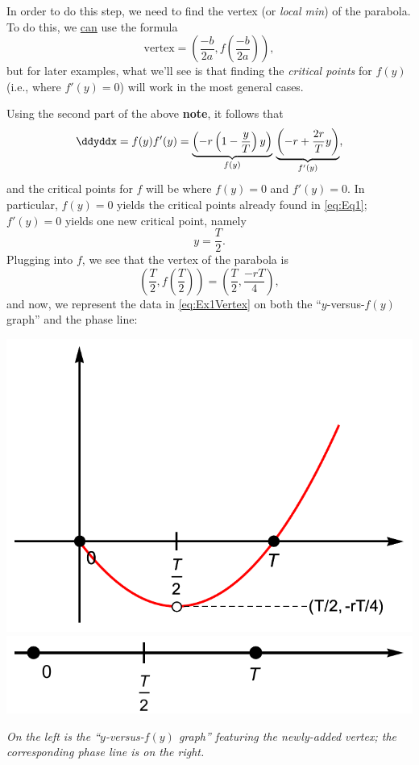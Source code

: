 \documentclass[12pt]{article}
\theoremstyle{definition}
\theoremstyle{underl}
\newcommand{\capt}[1]{\begin{adjustwidth}{0.5in}{0.5in}\centering\small\textit{#1}\end{adjustwidth}}
\begin{document}
	In order to do this step, we need to find the vertex (or \textit{local min}) of the parabola. To do this, we \ul{can} use the formula
	$$\text{vertex}=\left(\frac{-b}{2a},f\left(\frac{-b}{2a}\right)\right),$$
	but for later examples, what we'll see is that finding the \textit{critical points} for $f(y)$ (i.e., where $f'(y)=0$) will work in the most general cases.
	
	Using the second part of the above  \textbf{note}, it follows that
	\begin{equation}
		\label{eq:CritPt1}
		\ddyddx=f(y)f'(y)=\underbrace{\left(-r\left(1-\frac{y}{T}\right) y\right)}_{f(y)}\,\underbrace{\left(-r+\frac{2r}{T}y\right)}_{f'(y)},
	\end{equation}
	and the critical points for $f$ will be where $f(y)=0$ and $f'(y)=0$. In particular, $f(y)=0$ yields the critical points already found in \eqref{eq:Eq1}; $f'(y)=0$ yields one new critical point, namely
	$$y=\frac{T}{2}.$$
	Plugging into $f$, we see that the vertex of the parabola is
	\begin{equation}
		\label{eq:Ex1Vertex}
		\left(\frac{T}{2},f\left(\frac{T}{2}\right)\right)=\left(\frac{T}{2},\frac{-rT}{4}\right),
	\end{equation}
	and now, we represent the data in \eqref{eq:Ex1Vertex} on both the ``$y$-versus-$f(y)$ graph'' and the phase line:
	\begin{center}
		\includegraphics[align=c,scale=0.675]{Ex1_yf(y)_2}
		\hspace{9mm}
		\includegraphics[align=c,scale=0.675]{Ex1_Phase_2}
		\vspace{1.5mm}
		\capt{On the left is the ``$y$-versus-$f(y)$ graph'' featuring the newly-added vertex; the corresponding phase line is on the right.}
	\end{center}
\end{document}
